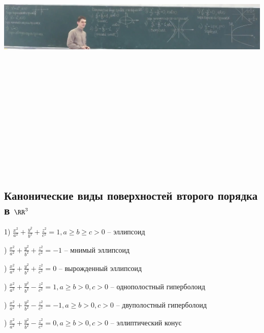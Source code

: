 \includegraphics[width=19cm,height=15cm,keepaspectratio]{example2.jpg}

\subsection{Канонические виды поверхностей второго порядка в $\RR^3$}

1) $\frac{x^2}{a^2} + \frac{y^2}{b^2} + \frac{z^2}{c^2} = 1, a \geqslant b \geqslant c > 0$ -- эллипсоид

) $\frac{x^2}{a^2} + \frac{y^2}{b^2} + \frac{z^2}{c^2} = -1$ -- мнимый эллипсоид

) $\frac{x^2}{a^2} + \frac{y^2}{b^2} + \frac{z^2}{c^2} = 0$ -- вырожденный эллипсоид

) $\frac{x^2}{a^2} + \frac{y^2}{b^2} - \frac{z^2}{c^2} = 1, a \geqslant b > 0, c > 0$ -- однополостный гиперболоид

) $\frac{x^2}{a^2} + \frac{y^2}{b^2} - \frac{z^2}{c^2} = -1, a \geqslant b > 0, c > 0$ -- двуполостный гиперболоид

) $\frac{x^2}{a^2} + \frac{y^2}{b^2} - \frac{z^2}{c^2} = 0, a \geqslant b > 0, c > 0$ -- эллиптический конус

